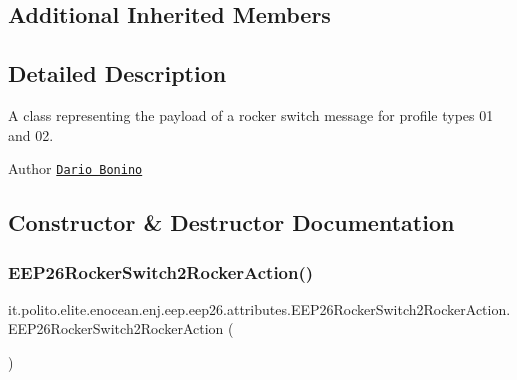 \subsection*{Additional Inherited Members}


\subsection{Detailed Description}
A class representing the payload of a rocker switch message for profile types 01 and 02.

\begin{DoxyAuthor}{Author}
\href{mailto:dario.bonino@gmail.com}{\tt Dario Bonino} 
\end{DoxyAuthor}


\subsection{Constructor \& Destructor Documentation}
\hypertarget{classit_1_1polito_1_1elite_1_1enocean_1_1enj_1_1eep_1_1eep26_1_1attributes_1_1_e_e_p26_rocker_switch2_rocker_action_a12aba67d3b61938f31c20f75b733ce5b}{}\label{classit_1_1polito_1_1elite_1_1enocean_1_1enj_1_1eep_1_1eep26_1_1attributes_1_1_e_e_p26_rocker_switch2_rocker_action_a12aba67d3b61938f31c20f75b733ce5b} 
\subsubsection{\texorpdfstring{E\+E\+P26\+Rocker\+Switch2\+Rocker\+Action()}{EEP26RockerSwitch2RockerAction()}}
{\footnotesize\ttfamily it.\+polito.\+elite.\+enocean.\+enj.\+eep.\+eep26.\+attributes.\+E\+E\+P26\+Rocker\+Switch2\+Rocker\+Action.\+E\+E\+P26\+Rocker\+Switch2\+Rocker\+Action (\begin{DoxyParamCaption}{ }\end{DoxyParamCaption})}

